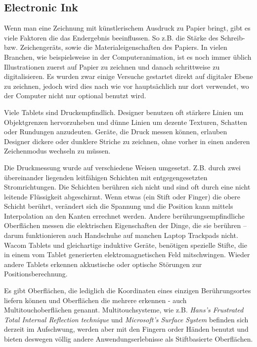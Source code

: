 \subsection{Electronic Ink}
Wenn man eine Zeichnung mit künstlerischem Ausdruck zu Papier bringt, gibt es viele Faktoren die das Endergebnis beeinflussen. So z.B. die Stärke des Schreib- bzw. Zeichengeräts, sowie die Materialeigenschaften des Papiers. In vielen Branchen, wie beispielsweise in der Computeranimation, ist es noch immer üblich Illustrationen zuerst auf Papier zu zeichnen und danach schrittweise zu digitalisieren. Es wurden zwar einige Versuche gestartet direkt auf digitaler Ebene zu zeichnen, jedoch wird dies nach wie vor hauptsächlich nur dort verwendet, wo der Computer nicht nur optional benutzt wird. \citep{Henzen:2005}

Viele Tablets sind Druckempfindlich. Designer benutzen oft stärkere Linien um Objektgrenzen hervorzuheben und dünne Linien um dezente Texturen, Schatten oder Rundungen anzudeuten. Geräte, die Druck messen können, erlauben Designer dickere oder dunklere Striche zu zeichnen, ohne vorher in einen anderen Zeichenmodus wechseln zu müssen.

Die Druckmessung wurde auf verschiedene Weisen umgesetzt. Z.B. durch zwei übereinander liegenden leitfähigen Schichten mit entgegengesetzten Stromrichtungen. Die Schichten berühren sich nicht und sind oft durch eine nicht leitende Flüssigkeit abgeschirmt. Wenn etwas (ein Stift oder Finger) die obere Schicht berührt, verändert sich die Spannung und die Position kann mittels Interpolation an den Kanten errechnet werden. Andere berührungsempfindliche Oberflächen messen die elektrischen Eigenschaften der Dinge, die sie berühren -- darum funktionieren auch Handschuhe auf manchen Laptop Trackpads nicht. Wacom\texttrademark{} Tablets und gleichartige induktive Geräte, benötigen spezielle Stifte, die in einem vom Tablet generierten elektromagnetischen Feld mitschwingen. Wieder andere Tablets erkennen akkustische oder optische Störungen zur Positionsberechnung.

Es gibt Oberflächen, die lediglich die Koordinaten eines einzigen Berührungsortes liefern können und Oberflächen die mehrere erkennen - auch Multitouchoberflächen genannt. Multitouchsysteme, wie z.B. \emph{Hans's Frustrated Total Internal Reflection technique} \citep{Han:2005} und \emph{Microsoft's Surface System} \citep{Surface:2010} befinden sich derzeit im Aufschwung, werden aber mit den Fingern order Händen benutzt und bieten deswegen völlig andere Anwendungserlebnisse als Stiftbasierte Oberflächen.

